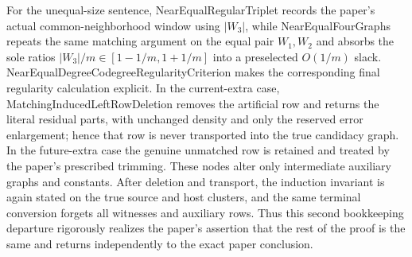 For the unequal-size sentence, NearEqualRegularTriplet records the paper's actual common-neighborhood window using $|W_3|$, while NearEqualFourGraphs repeats the same matching argument on the equal pair $W_1,W_2$ and absorbs the sole ratios $|W_3|/m\in[1-1/m,1+1/m]$ into a preselected $O(1/m)$ slack. NearEqualDegreeCodegreeRegularityCriterion makes the corresponding final regularity calculation explicit. In the current-extra case, MatchingInducedLeftRowDeletion removes the artificial row and returns the literal residual parts, with unchanged density and only the reserved error enlargement; hence that row is never transported into the true candidacy graph. In the future-extra case the genuine unmatched row is retained and treated by the paper's prescribed trimming. These nodes alter only intermediate auxiliary graphs and constants. After deletion and transport, the induction invariant is again stated on the true source and host clusters, and the same terminal conversion forgets all witnesses and auxiliary rows. Thus this second bookkeeping departure rigorously realizes the paper's assertion that the rest of the proof is the same and returns independently to the exact paper conclusion.
